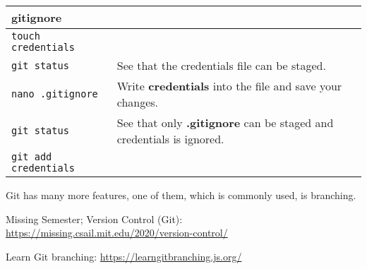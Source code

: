 \documentclass[paper=a4]{scrartcl}
\let\oldtexttt\texttt
\renewcommand{\texttt}[1]{
  \colorbox{bgcolor}{\oldtexttt{#1}}
  }
\begin{document}
\begin{longtable}{ p{} p{}}
      
        \textbf{gitignore}\\
        \hline
        \texttt{touch credentials}\\
        \texttt{git status} & See that the credentials file can be staged.\\
        \texttt{nano .gitignore} & Write \textbf{credentials} into the file and save your changes.\\
        \texttt{git status} & See that only \textbf{.gitignore} can be staged and credentials is ignored.\\
        \texttt{git add credentials}\\
\end{longtable}

Git has many more features, one of them, which is commonly used, is branching.
\begin{literature}
  \item Missing Semester; Version Control (Git): \url{https://missing.csail.mit.edu/2020/version-control/}
  \item Learn Git branching: \url{https://learngitbranching.js.org/}
\end{literature}
\end{document}
